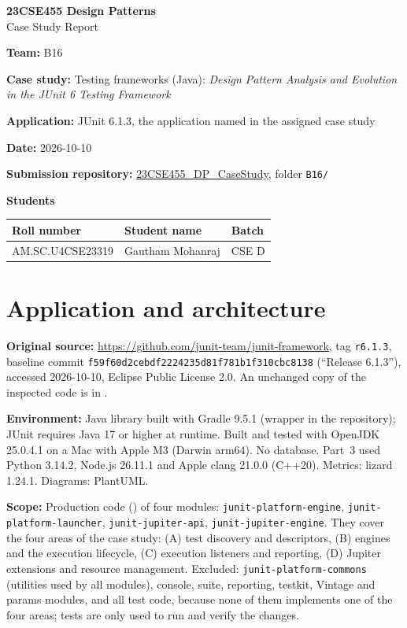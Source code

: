 \documentclass[11pt,a4paper]{article}
\newcommand{\entry}[1]{\textbf{#1:} }
\begin{document}
\begin{center}\Large\textbf{23CSE455 Design Patterns}\\[4pt]\LARGE Case Study Report\end{center}

\entry{Team}B16\par
\entry{Case study}Testing frameworks (Java): \emph{Design Pattern Analysis and Evolution in the JUnit 6 Testing Framework}\par
\entry{Application}JUnit 6.1.3, the application named in the assigned case study\par
\entry{Date}2026-10-10\par
\textbf{Submission repository:} \href{https://github.com/aswathymohan-amrita/23CSE455_DP_CaseStudy}{23CSE455\_DP\_CaseStudy}, folder \texttt{B16/}\par
\textbf{Students}\par
\begin{tabularx}{\linewidth}{@{}llX@{}}\toprule
Roll number & Student name & Batch\\\midrule
AM.SC.U4CSE23319 & Gautham Mohanraj & CSE D\\\bottomrule
\end{tabularx}

\section{Application and architecture}
\entry{Original source}\url{https://github.com/junit-team/junit-framework}, tag \texttt{r6.1.3}, baseline commit \texttt{f59f60d2cebdf2224235d81f781b1f310cbc8138} (``Release 6.1.3''), accessed 2026-10-10, Eclipse Public License 2.0. An unchanged copy of the inspected code is in .

\entry{Environment}Java library built with Gradle 9.5.1 (wrapper in the repository); JUnit requires Java 17 or higher at runtime. Built and tested with OpenJDK 25.0.4.1 on a Mac with Apple M3 (Darwin arm64). No database. Part~3 used Python 3.14.2, Node.js 26.11.1 and Apple clang 21.0.0 (C++20). Metrics: lizard 1.24.1. Diagrams: PlantUML.

\entry{Scope}Production code () of four modules: \texttt{junit-platform-engine}, \texttt{junit-platform-launcher}, \texttt{junit-jupiter-api}, \texttt{junit-jupiter-engine}. They cover the four areas of the case study: (A) test discovery and descriptors, (B) engines and the execution lifecycle, (C) execution listeners and reporting, (D) Jupiter extensions and resource management. Excluded: \texttt{junit-platform-commons} (utilities used by all modules), console, suite, reporting, testkit, Vintage and params modules, and all test code, because none of them implements one of the four areas; tests are only used to run and verify the changes.
\end{document}
